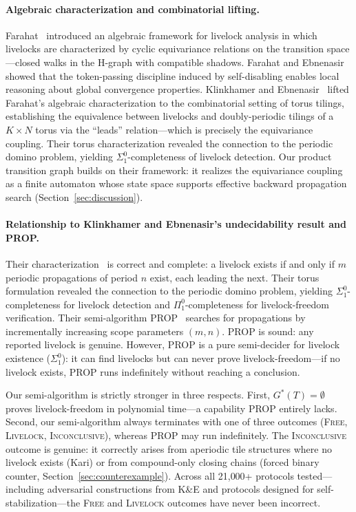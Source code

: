 \documentclass[11pt]{article}
\begin{document}
\paragraph{Algebraic characterization and combinatorial lifting.} Farahat~\cite{farahat-diss} introduced an algebraic framework for livelock analysis in which livelocks are characterized by cyclic equivariance relations on the transition space---closed walks in the H-graph with compatible shadows. Farahat and Ebnenasir~\cite{farahat-icdcs2012} showed that the token-passing discipline induced by self-disabling enables local reasoning about global convergence properties. Klinkhamer and Ebnenasir~\cite{klinkhamer-ebnenasir} lifted Farahat's algebraic characterization to the combinatorial setting of torus tilings, establishing the equivalence between livelocks and doubly-periodic tilings of a $K \times N$ torus via the ``leads'' relation---which is precisely the equivariance coupling. Their torus characterization revealed the connection to the periodic domino problem, yielding $\Sigma^0_1$-completeness of livelock detection. Our product transition graph builds on their framework: it realizes the equivariance coupling as a finite automaton whose state space supports effective backward propagation search (Section~\ref{sec:discussion}).

\paragraph{Relationship to Klinkhamer and Ebnenasir's undecidability result and PROP.}
Their characterization~\cite{klinkhamer-ebnenasir} is correct and complete: a livelock exists if and only if $m$ periodic propagations of period $n$ exist, each leading the next. Their torus formulation revealed the connection to the periodic domino problem, yielding $\Sigma^0_1$-completeness for livelock detection and $\Pi^0_1$-completeness for livelock-freedom verification. Their semi-algorithm PROP~\cite{klinkhamer-tr} searches for propagations by incrementally increasing scope parameters $(m, n)$. PROP is sound: any reported livelock is genuine. However, PROP is a pure semi-decider for livelock existence ($\Sigma^0_1$): it can find livelocks but can never prove livelock-freedom---if no livelock exists, PROP runs indefinitely without reaching a conclusion.

Our semi-algorithm is strictly stronger in three respects. First, $G^*(T) = \emptyset$ proves livelock-freedom in polynomial time---a capability PROP entirely lacks. Second, our semi-algorithm always terminates with one of three outcomes (\textsc{Free}, \textsc{Livelock}, \textsc{Inconclusive}), whereas PROP may run indefinitely. The \textsc{Inconclusive} outcome is genuine: it correctly arises from aperiodic tile structures where no livelock exists (Kari) or from compound-only closing chains (forced binary counter, Section~\ref{sec:counterexample}). Across all 21{,}000+ protocols tested---including adversarial constructions from K\&E and protocols designed for self-stabilization---the \textsc{Free} and \textsc{Livelock} outcomes have never been incorrect.
\end{document}
